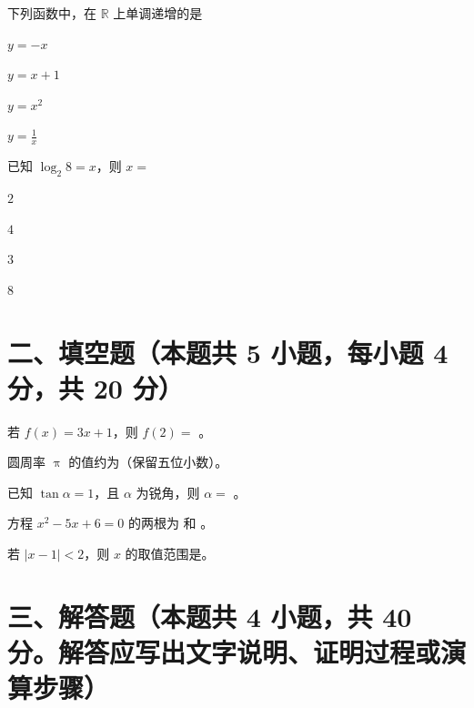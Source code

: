 \documentclass{exam-zh}
\begin{document}
\begin{question}
  下列函数中，在 $\mathbb{R}$ 上单调递增的是\paren[B]
  \begin{choices}
    \item $y = -x$
    \item $y = x + 1$
    \item $y = x^2$
    \item $y = \frac{1}{x}$
  \end{choices}
\end{question}

\begin{question}
  已知 $\log_2 8 = x$，则 $x = $ \paren[C]
  \begin{choices}
    \item $2$
    \item $4$
    \item $3$
    \item $8$
  \end{choices}
\end{question}


\section{二、填空题（本题共 5 小题，每小题 4 分，共 20 分）}

\begin{question}
  若 $f(x) = 3x + 1$，则 $f(2) = $ \fillin[7]。
\end{question}

\begin{question}
  圆周率 $\uppi$ 的值约为\fillin[3.14159]（保留五位小数）。
\end{question}

\begin{question}
  已知 $\tan \alpha = 1$，且 $\alpha$ 为锐角，则 $\alpha = $ \fillin[$45^\circ$] 。
\end{question}

\begin{question}
  方程 $x^2 - 5x + 6 = 0$ 的两根为 \fillin[2] 和 \fillin[3]。
\end{question}

\begin{question}
  若 $|x - 1| < 2$，则 $x$ 的取值范围是\fillin[$(-1, 3)$]。
\end{question}


\section{三、解答题（本题共 4 小题，共 40 分。解答应写出文字说明、证明过程或演算步骤）}
\end{document}
